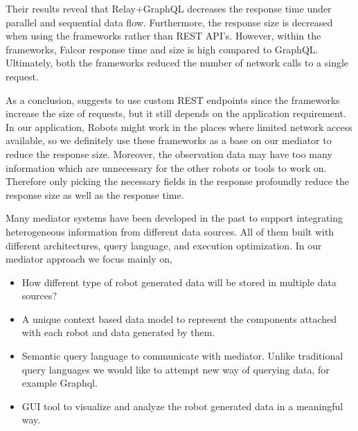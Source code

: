 	Their results reveal that Relay+GraphQL decreases the response time under parallel and sequential data flow. Furthermore, the response size is decreased when using the frameworks rather than REST API's. However, within the frameworks, Falcor response time and size is high compared to GraphQL. Ultimately, both the frameworks reduced the number of network calls to a single request.
	
	As a conclusion, \citet{cederlund2016performance} suggests to use custom REST endpoints since the frameworks increase the size of requests, but it still depends on the application requirement. In our application, Robots might work in the places where limited network access available, so we definitely use these frameworks as a base on our mediator to reduce the response size. Moreover, the observation data may have too many information which are unnecessary for the other robots or tools to work on. Therefore only picking the necessary fields in the response profoundly reduce the response size as well as the response time.

	
	Many mediator systems have been developed in the past to support integrating heterogeneous information from different data sources. All of them built with different architectures, query language, and execution optimization. In our mediator approach we focus mainly on,
	\begin{itemize}
		\item How different type of robot generated data will be stored in multiple data sources?
		\item A unique context based data model to represent the components attached with each robot and data generated by them.
		\item Semantic query language to communicate with mediator. Unlike traditional query languages we would like to attempt new way of querying data, for example Graphql.
		\item GUI tool to visualize and analyze the robot generated data in a meaningful way.
	\end{itemize} 


